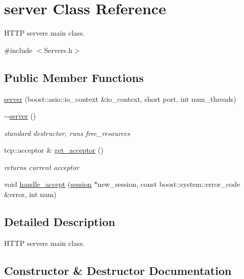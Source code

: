 \hypertarget{classserver}{}\section{server Class Reference}
\label{classserver}


H\+T\+TP server\textquotesingle{}s main class.  




{\ttfamily \#include $<$Servers.\+h$>$}

\subsection*{Public Member Functions}
\begin{DoxyCompactItemize}
\item 
\hyperlink{classserver_a9ad81c9f749b6113ac9aebee191bb7ff}{server} (boost\+::asio\+::io\+\_\+context \&io\+\_\+context, short port, int num\+\_\+threads)
\item 
\mbox{\label{classserver_ae3de4182db6fe6c656036f9e4da49204}} 
\hyperlink{classserver_ae3de4182db6fe6c656036f9e4da49204}{$\sim$server} ()
\begin{DoxyCompactList}\small\item\em standard destructor, runs free\+\_\+resources \end{DoxyCompactList}\item 
\mbox{\label{classserver_a90bbf4bdc02734ed4e82e4251090e929}} 
tcp\+::acceptor \& \hyperlink{classserver_a90bbf4bdc02734ed4e82e4251090e929}{get\+\_\+acceptor} ()
\begin{DoxyCompactList}\small\item\em returns current acceptor \end{DoxyCompactList}\item 
void \hyperlink{classserver_a195cc0f2e527393bb307cee99804d66a}{handle\+\_\+accept} (\hyperlink{classsession}{session} $\ast$new\+\_\+session, const boost\+::system\+::error\+\_\+code \&error, int num)
\end{DoxyCompactItemize}


\subsection{Detailed Description}
H\+T\+TP server\textquotesingle{}s main class. 

\subsection{Constructor \& Destructor Documentation}
\mbox{\label{classserver_a9ad81c9f749b6113ac9aebee191bb7ff}} 
